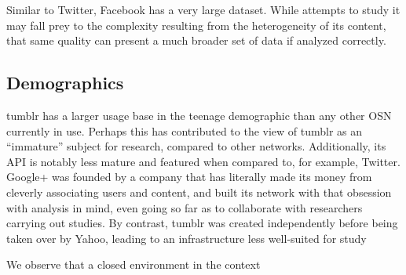  
Similar to Twitter, Facebook has a very large dataset.  While attempts 
to study it may fall prey to the complexity resulting from the 
heterogeneity of its content, that same quality can present a much 
broader set of data if analyzed correctly.

\subsection{Demographics}
tumblr has a larger usage base in the teenage demographic than any 
other OSN currently in use.  Perhaps this has contributed to the view 
of tumblr as an ``immature'' subject for research, compared to other 
networks.  Additionally, its API is notably less mature and 
featured when compared to, for example, Twitter.  Google+ was founded 
by a company that has literally made its money from cleverly 
associating users and content, and built its network with that 
obsession with analysis in mind, even going so far as to collaborate 
with researchers carrying out studies\cite{kairam2012talking}.  By contrast, tumblr was 
created independently before being taken over by Yahoo, leading to an 
infrastructure less well-suited for study

\cite{alexander2002introduction}

We observe that a closed environment in the context
